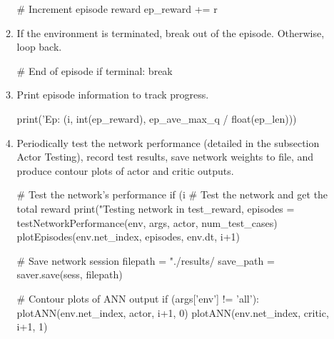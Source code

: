 \begin{enumerate}
\begin{enumerate}
\begin{python}[caption={Step Cleanup},label={list:ep_clean},xleftmargin=\dimexpr-\csname @totalleftmargin\endcsname]
# Increment episode reward
ep_reward += r
	\end{python}
	\item If the environment is terminated, break out of the episode. Otherwise, loop back.
	\begin{python}[caption={Episode Termination},label={list:ep_term},xleftmargin=\dimexpr-\csname @totalleftmargin\endcsname]
# End of episode
if terminal:
  	break
	\end{python}
	\item Print episode information to track progress.
	\begin{python}[caption={Print Episode Results},label={list:print_ep},xleftmargin=\dimexpr-\csname @totalleftmargin\endcsname]
print('Ep: %
	(i, int(ep_reward), ep_ave_max_q / float(ep_len)))
	\end{python}
	\item Periodically test the network performance (detailed in the subsection Actor Testing), record test results, save network weights to file, and produce contour plots of actor and critic outputs.
	\begin{python}[caption={Network Evaluation},label={list:net_eval},xleftmargin=\dimexpr-\csname @totalleftmargin\endcsname]
# Test the network's performance
if (i %
    # Test the network and get the total reward
    print("Testing network in %
    test_reward, episodes = testNetworkPerformance(env, args, actor, num_test_cases)
    plotEpisodes(env.net_index, episodes, env.dt, i+1)

    # Save network session
    filepath = "./results/%
    save_path = saver.save(sess, filepath)

    # Contour plots of ANN output
    if (args['env'] != 'all'):
        plotANN(env.net_index, actor, i+1, 0)
        plotANN(env.net_index, critic, i+1, 1)
	\end{python}	
	\end{enumerate}
\end{enumerate}

